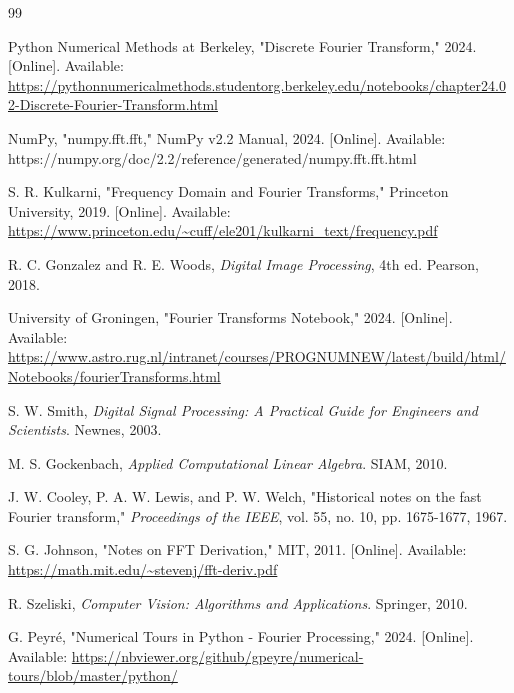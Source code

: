 \documentclass[conference]{IEEEtran}
\begin{document}
\begin{thebibliography}{99}

Python Numerical Methods at Berkeley, "Discrete Fourier Transform," 2024. [Online]. Available: \url{https://pythonnumericalmethods.studentorg.berkeley.edu/notebooks/chapter24.02-Discrete-Fourier-Transform.html}

NumPy, "numpy.fft.fft," NumPy v2.2 Manual, 2024. [Online]. Available: https://numpy.org/doc/2.2/reference/generated/numpy.fft.fft.html

S. R. Kulkarni, "Frequency Domain and Fourier Transforms," Princeton University, 2019. [Online]. Available:
\url{https://www.princeton.edu/~cuff/ele201/kulkarni_text/frequency.pdf}

R. C. Gonzalez and R. E. Woods, \textit{Digital Image Processing}, 4th ed. Pearson, 2018.

University of Groningen, "Fourier Transforms Notebook," 2024. [Online]. Available: 
\url{https://www.astro.rug.nl/intranet/courses/PROGNUMNEW/latest/build/html/Notebooks/fourierTransforms.html}

S. W. Smith, \textit{Digital Signal Processing: A Practical Guide for Engineers and Scientists}. Newnes, 2003.

M. S. Gockenbach, \textit{Applied Computational Linear Algebra}. SIAM, 2010.

J. W. Cooley, P. A. W. Lewis, and P. W. Welch, "Historical notes on the fast Fourier transform," \textit{Proceedings of the IEEE}, vol. 55, no. 10, pp. 1675-1677, 1967.

S. G. Johnson, "Notes on FFT Derivation," MIT, 2011. [Online]. Available:
\url{https://math.mit.edu/~stevenj/fft-deriv.pdf}

R. Szeliski, \textit{Computer Vision: Algorithms and Applications}. Springer, 2010.

G. Peyré, "Numerical Tours in Python - Fourier Processing," 2024. [Online]. Available: 
\url {https://nbviewer.org/github/gpeyre/numerical-tours/blob/master/python/}

\end{thebibliography}
\end{document}
